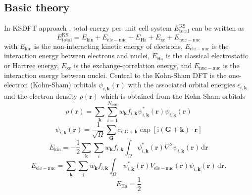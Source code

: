 \documentclass[a0,landscape]{a0poster}
\begin{document}
\begin{multicols}{3}
\section*{Basic theory}

In KSDFT approach \cite{Hohenberg1964,Kohn1965}, total energy per unit cell system
$E^{\mathrm{KS}}_{\mathrm{total}}$ can be written as
\begin{equation}
E^{\mathrm{KS}}_{\mathrm{total}} =
E_{\mathrm{kin}} + E_{\mathrm{ele-nuc}} +
E_{\mathrm{Ha}} + E_{\mathrm{xc}} + E_{\mathrm{nuc-nuc}}
\label{eq:E_KS_total}
\end{equation}
with $E_\mathrm{kin}$ is the non-interacting kinetic energy of electrons,
$E_{\mathrm{ele-nuc}}$ is the interaction energy between electrons and nuclei,
$E_{\mathrm{Ha}}$ is the classical electrostatic or Hartree energy,
$E_{\mathrm{xc}}$ is the exchange-correlation energy, and
$E_{\mathrm{nuc-nuc}}$ is the interaction energy between nuclei.
Central to the Kohn-Sham DFT is the one-electron
(Kohn-Sham) orbitals $\psi_{i,\mathbf{k}}(\mathbf{r})$
with the associated orbital energies $\epsilon_{i,\mathbf{k}}$
and the electron density $\rho(\mathbf{r})$ which is obtained from
the Kohn-Sham orbitals
\begin{equation}
\rho(\mathbf{r}) = \sum_{\mathbf{k}} 
\sum_{i=1}^{N_{\mathbf{occ}}}
w_{\mathbf{k}}
f_{i,\mathbf{k}}
\psi^{*}_{i,\mathbf{k}}(\mathbf{r})
\psi_{i,\mathbf{k}}(\mathbf{r})
\label{eq:rhoel}
\end{equation}
%
\begin{equation}
\psi_{i,\mathbf{k}}(\mathbf{r}) = 
\frac{1}{\sqrt{\Omega}}
\sum_{\mathbf{G}}
c_{i,\mathbf{G}+\mathbf{k}}
\exp\left[
\mathrm{i}\left(\mathbf{G}+\mathbf{k}\right)\cdot\mathbf{r}
\right]
\end{equation}
%
\begin{equation}
E_{\mathrm{kin}} = -\frac{1}{2} \sum_{\mathbf{k}} \sum_{i}
w_{\mathbf{k}} f_{i,\mathbf{k}}
\int_{\Omega}
\psi^{*}_{i,\mathbf{k}}(\mathbf{r})
\nabla^2
\psi_{i,\mathbf{k}}(\mathbf{r})
\,
\mathrm{d}\mathbf{r}
\label{eq:Kin_energy}
\end{equation}
%
\begin{equation}
E_{\mathrm{ele-nuc}} = 
\sum_{\mathbf{k}}
\sum_{i}
w_{\mathbf{k}}
f_{i,\mathbf{k}}
\int_{\Omega}\,
\psi^{*}_{i,\mathbf{k}}(\mathbf{r})
V_{\mathrm{ele-nuc}}(\mathbf{r})
\psi_{i,\mathbf{k}}(\mathbf{r})
\,\mathrm{d}\mathbf{r}.
\label{eq:E_ele_nuc}
\end{equation}
%
\begin{equation}
E_{\mathrm{Ha}} = \frac{1}{2}

\end{equation}
\end{multicols}
\end{document}
